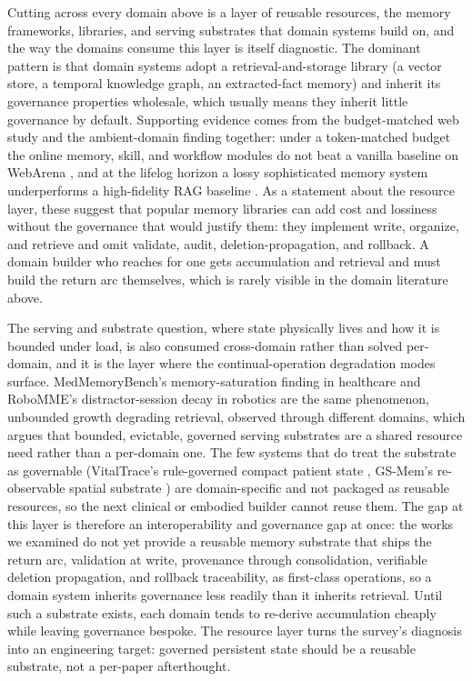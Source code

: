 Cutting across every domain above is a layer of reusable resources, the memory frameworks, libraries, and serving substrates that domain systems build on, and the way the domains consume this layer is itself diagnostic. The dominant pattern is that domain systems adopt a retrieval-and-storage library (a vector store, a temporal knowledge graph, an extracted-fact memory) and inherit its governance properties wholesale, which usually means they inherit little governance by default. Supporting evidence comes from the budget-matched web study and the ambient-domain finding together: under a token-matched budget the online memory, skill, and workflow modules do not beat a vanilla baseline on WebArena \citep{hajimiri2026budgetconstrained}, and at the lifelog horizon a lossy sophisticated memory system underperforms a high-fidelity RAG baseline \citep{zheng2026lifedial}. As a statement about the resource layer, these suggest that popular memory libraries can add cost and lossiness without the governance that would justify them: they implement write, organize, and retrieve and omit validate, audit, deletion-propagation, and rollback. A domain builder who reaches for one gets accumulation and retrieval and must build the return arc themselves, which is rarely visible in the domain literature above.

The serving and substrate question, where state physically lives and how it is bounded under load, is also consumed cross-domain rather than solved per-domain, and it is the layer where the continual-operation degradation modes surface. MedMemoryBench's memory-saturation finding in healthcare \citep{wang2026medmemorybench} and RoboMME's distractor-session decay in robotics \citep{rathi2026robomme} are the same phenomenon, unbounded growth degrading retrieval, observed through different domains, which argues that bounded, evictable, governed serving substrates are a shared resource need rather than a per-domain one. The few systems that do treat the substrate as governable (VitalTrace's rule-governed compact patient state \citep{qu2026vitaltrace}, GS-Mem's re-observable spatial substrate \citep{lu2026gsmem}) are domain-specific and not packaged as reusable resources, so the next clinical or embodied builder cannot reuse them. The gap at this layer is therefore an interoperability and governance gap at once: the works we examined do not yet provide a reusable memory substrate that ships the return arc, validation at write, provenance through consolidation, verifiable deletion propagation, and rollback traceability, as first-class operations, so a domain system inherits governance less readily than it inherits retrieval. Until such a substrate exists, each domain tends to re-derive accumulation cheaply while leaving governance bespoke. The resource layer turns the survey's diagnosis into an engineering target: governed persistent state should be a reusable substrate, not a per-paper afterthought.
